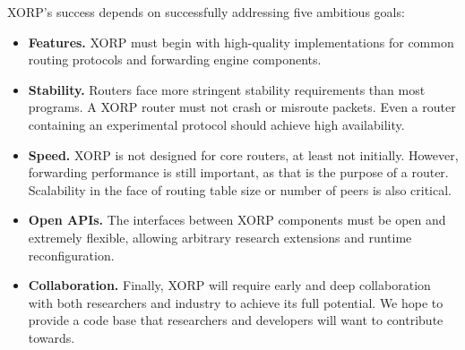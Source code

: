 XORP's success depends on successfully addressing five ambitious goals:
\begin{itemize}\addtolength{\itemsep}{-0.5\baselineskip}

\item \textbf{Features.} XORP must begin with high-quality implementations
for common routing protocols and forwarding engine components. 

\item \textbf{Stability.} Routers face more stringent stability
requirements than most programs. A XORP router must not crash or misroute
packets. Even a router containing an experimental protocol should achieve
high availability.

\item \textbf{Speed.} XORP is not designed for core routers, at least not
initially. However, forwarding performance is still important, as that
is the purpose of a router.  Scalability in the face of routing table
size or number of peers is also critical.

\item \textbf{Open APIs.} The interfaces between XORP components must be
open and extremely flexible, allowing arbitrary research extensions and
runtime reconfiguration. 

\item \textbf{Collaboration.} Finally, XORP will require early and deep
collaboration with both researchers and industry to achieve its full
potential.  We hope to provide a code base that researchers and
developers will want to contribute towards.

\end{itemize}
